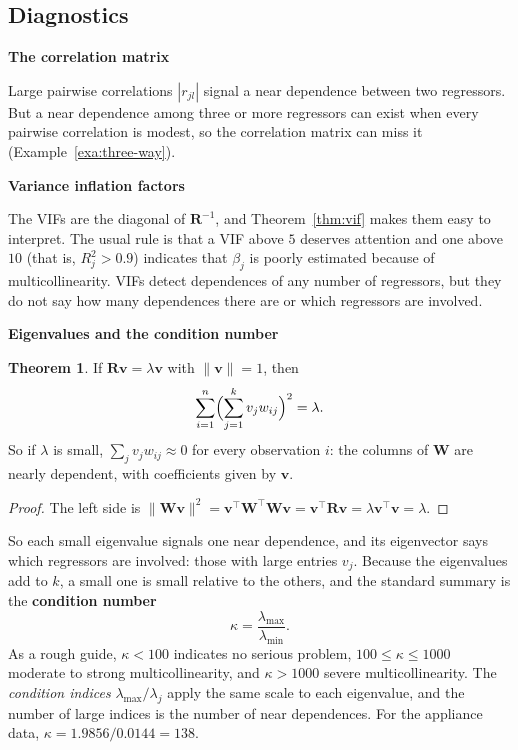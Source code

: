 \documentclass[11pt,a4paper]{article}
\numberwithin{equation}{section}
\theoremstyle{definition}
\newtheorem{thm}{Theorem}[subsection]
\newcommand{\subhead}[1]{%
  \par\medskip\noindent\textbf{#1}\par\nobreak\smallskip}
\begin{document}
\subsection{Diagnostics}
\subhead{The correlation matrix}
Large pairwise correlations $|r_{jl}|$ signal a near dependence between two regressors. But a near
dependence among three or more regressors can exist when every pairwise correlation is modest, so
the correlation matrix can miss it (Example~\ref{exa:three-way}).

\subhead{Variance inflation factors}
The VIFs are the diagonal of $\mathbf{R}^{-1}$, and Theorem~\ref{thm:vif} makes them easy to interpret.
The usual rule is that a VIF above $5$ deserves attention and one above $10$ (that is, $R_j^2 > 0.9$)
indicates that $\beta_j$ is poorly estimated because of multicollinearity. VIFs detect dependences of
any number of regressors, but they do not say how many dependences there are or which regressors are
involved.

\subhead{Eigenvalues and the condition number}
\begin{thm}\label{thm:eigen-dependence}
If $\mathbf{R}\mathbf{v} = \lambda\mathbf{v}$ with $\|\mathbf{v}\| = 1$, then
\[
\sum_{i=1}^n\Bigl(\sum_{j=1}^k v_jw_{ij}\Bigr)^2 = \lambda .
\]
So if $\lambda$ is small, $\sum_j v_jw_{ij} \approx 0$ for every observation $i$: the columns of $\mathbf{W}$
are nearly dependent, with coefficients given by $\mathbf{v}$.
\end{thm}

\begin{proof}
The left side is $\|\mathbf{Wv}\|^2 = \mathbf{v}^\top\mathbf{W}^\top\mathbf{W}\mathbf{v} = \mathbf{v}^\top\mathbf{R}\mathbf{v} = \lambda\mathbf{v}^\top\mathbf{v} = \lambda$.
\end{proof}

So each small eigenvalue signals one near dependence, and its eigenvector says which regressors are
involved: those with large entries $v_j$. Because the eigenvalues add to $k$, a small one is small
relative to the others, and the standard summary is the \textbf{condition number}
\[
\kappa = \frac{\lambda_{\max}}{\lambda_{\min}} .
\]
As a rough guide, $\kappa < 100$ indicates no serious problem, $100 \le \kappa \le 1000$ moderate to strong
multicollinearity, and $\kappa > 1000$ severe multicollinearity. The \emph{condition indices}
$\lambda_{\max}/\lambda_j$ apply the same scale to each eigenvalue, and the number of large indices is the
number of near dependences. For the appliance data, $\kappa = 1.9856/0.0144 = 138$.
\end{document}

